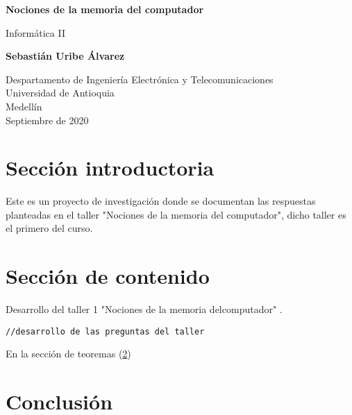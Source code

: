 \documentclass{article}
\begin{document}
\begin{titlepage}
    \begin{center}
        \vspace*{1cm}
            
        \Huge
        \textbf{Nociones de la memoria del computador}
            
        \vspace{0.5cm}
        \LARGE
        Informática II
            
        \vspace{1.5cm}
            
        \textbf{Sebastián Uribe Álvarez}
            
        \vfill
            
        \vspace{0.8cm}
            
        \Large
        Despartamento de Ingeniería Electrónica y Telecomunicaciones\\
        Universidad de Antioquia\\
        Medellín\\
        Septiembre de 2020
            
    \end{center}
\end{titlepage}

\tableofcontents

\section{Sección introductoria}
Este es un proyecto de investigación donde se documentan las respuestas planteadas en el taller "Nociones de la memoria del computador", dicho taller es el primero del curso.

\section{Sección de contenido} \label{contenido}

Desarrollo del taller 1 "Nociones de la memoria delcomputador"
. \cite{dirac}

\begin{lstlisting}
//desarrollo de las preguntas del taller
\end{lstlisting}





En la sección de teoremas (\ref{contenido})

\section{Conclusión} \label{conclulsion}



\end{document}
